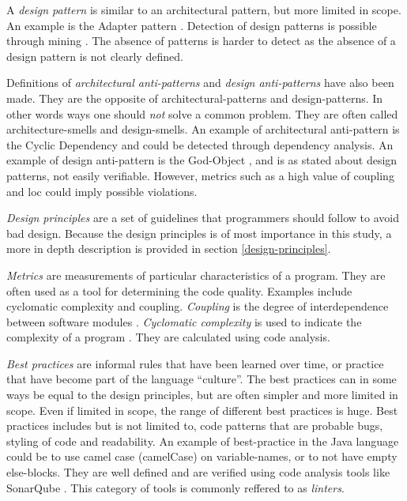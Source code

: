 \documentclass{report}
\begin{document}
A \textit{design pattern} is similar to an architectural pattern, but more limited in scope. An example is the Adapter pattern \cite{Adapterp54:online}. Detection of design patterns is possible through mining \cite{TEKIN2014406}. The absence of patterns is harder to detect as the absence of a design pattern is not clearly defined.

Definitions of \textit{architectural anti-patterns} and \textit{design anti-patterns} have also been made. They are the opposite of architectural-patterns and design-patterns. In other words ways one should {\em not} solve a common problem. They are often called architecture-smells and design-smells. An example of architectural anti-pattern is the Cyclic Dependency \cite{cyclicdependency} and could be detected through dependency analysis. An example of design anti-pattern is the God-Object \cite{Godobjec14:online}, and is as stated about design patterns, not easily verifiable. However, metrics such as a high value of coupling and \gls{loc} could imply possible violations.


\textit{Design principles} are a set of guidelines that programmers should follow to avoid bad design. Because the design principles is of most importance in this study, a more in depth description is provided in section \ref{design-principles}.

\textit{Metrics} are measurements of particular characteristics of a program. They are often used as a tool for determining the code quality. Examples include cyclomatic complexity and coupling. \textit{Coupling} is the degree of interdependence between software modules \cite{Coupling2:online}. \textit{Cyclomatic complexity} is used to indicate the complexity of a program \cite{Cyclomat54:online}. They are calculated using code analysis.

\textit{Best practices} are informal rules that have been learned over time, or practice that have become part of the language ``culture''. The best practices can in some ways be equal to the design principles, but are often simpler and more limited in scope. Even if limited in scope, the range of different best practices is huge. Best practices includes but is not limited to, code patterns that are probable bugs, styling of code and readability. An example of best-practice in the Java language could be to use camel case (camelCase) \cite{camelcase} on variable-names, or to not have empty else-blocks. They are well defined and are verified using code analysis tools like SonarQube \cite{sonarqube}. This category of tools is commonly reffered to as \textit{linters}.
\end{document}
